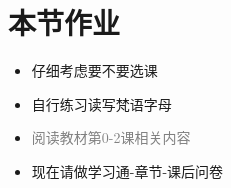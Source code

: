 \documentclass[17pt]{beamer}
\begin{document}
\section{本节作业}

\begin{frame}{\insertsection }
  \begin{itemize}
    \item
      仔细考虑要不要选课
    \item
      自行练习读写梵语字母
    \item
      \textcolor{gray}{阅读教材第0-2课相关内容}
    \bigskip
    \item
      现在请做学习通\nobreakdash-章节\nobreakdash-课后问卷
  \end{itemize}
\end{frame}  
\end{document}
